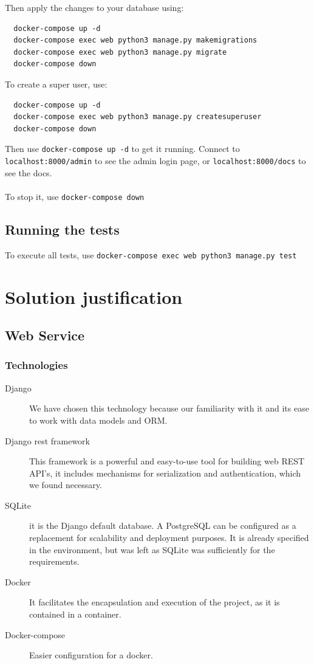 \documentclass[11pt]{article}
\begin{document}
Then apply the changes to your database using:

\begin{verbatim}
  docker-compose up -d
  docker-compose exec web python3 manage.py makemigrations
  docker-compose exec web python3 manage.py migrate
  docker-compose down
\end{verbatim}

To create a super user, use:

\begin{verbatim}
  docker-compose up -d
  docker-compose exec web python3 manage.py createsuperuser
  docker-compose down
\end{verbatim}

Then use \texttt{docker-compose up -d} to get it running. Connect to
\texttt{localhost:8000/admin} to see the admin login page, or
\texttt{localhost:8000/docs} to see the docs.
\\
\\
To stop it, use \texttt{docker-compose down}

\subsection{Running the tests}
\label{sec:orga7a521a}
To execute all tests, use
\texttt{docker-compose exec web python3 manage.py test}

\section{Solution justification}
\label{sec:orgf644e87}
\subsection{Web Service}
\label{sec:org3a6a157}
\subsubsection{Technologies}
\label{sec:org3f4b312}

\begin{description}
\item[{Django}] We have chosen this technology because our familiarity with it
and its ease to work with data models and ORM.

\item[{Django rest framework}] This framework is a powerful and easy-to-use
tool for building web REST API's, it includes mechanisms for
serialization and authentication, which we found necessary.

\item[{SQLite}] it is the Django default database. A PostgreSQL  can be
configured as a replacement for scalability and deployment purposes.
It is already specified in the environment, but was left as SQLite
was sufficiently for the requirements.

\item[{Docker}] It facilitates the encapsulation and execution of the
project, as it is contained in a container.

\item[{Docker-compose}] Easier configuration for a docker.
\end{description}
\end{document}
